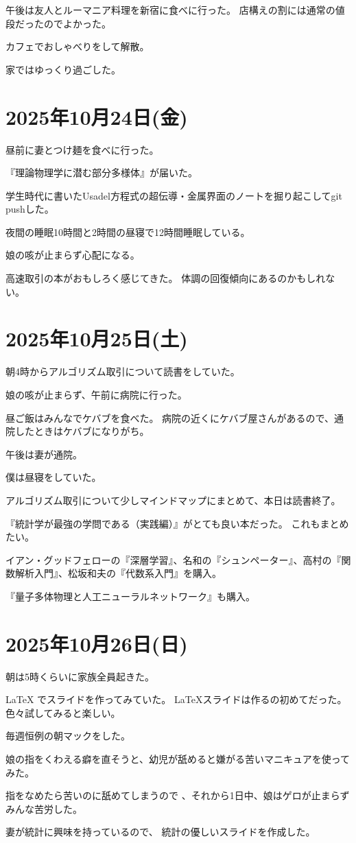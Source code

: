 \documentclass[uplatex]{jsarticle}
\begin{document}
午後は友人とルーマニア料理を新宿に食べに行った。
店構えの割には通常の値段だったのでよかった。

カフェでおしゃべりをして解散。

家ではゆっくり過ごした。

\section{2025年10月24日(金)} 

昼前に妻とつけ麺を食べに行った。

『理論物理学に潜む部分多様体』が届いた。

学生時代に書いたUsadel方程式の超伝導・金属界面のノートを掘り起こしてgit pushした。

夜間の睡眠10時間と2時間の昼寝で12時間睡眠している。

娘の咳が止まらず心配になる。

高速取引の本がおもしろく感じてきた。
体調の回復傾向にあるのかもしれない。

\section{2025年10月25日(土)} 

朝4時からアルゴリズム取引について読書をしていた。

娘の咳が止まらず、午前に病院に行った。

昼ご飯はみんなでケバブを食べた。
病院の近くにケバブ屋さんがあるので、通院したときはケバブになりがち。

午後は妻が通院。

僕は昼寝をしていた。

アルゴリズム取引について少しマインドマップにまとめて、本日は読書終了。

『統計学が最強の学問である（実践編）』がとても良い本だった。
これもまとめたい。

イアン・グッドフェローの『深層学習』、名和の『シュンペーター』、高村の『関数解析入門』、松坂和夫の『代数系入門』を購入。

『量子多体物理と人工ニューラルネットワーク』も購入。

\section{2025年10月26日(日)}

朝は5時くらいに家族全員起きた。

LaTeX でスライドを作ってみていた。
LaTeXスライドは作るの初めてだった。
色々試してみると楽しい。

毎週恒例の朝マックをした。

娘の指をくわえる癖を直そうと、幼児が舐めると嫌がる苦いマニキュアを使ってみた。

指をなめたら苦いのに舐めてしまうので 、それから1日中、娘はゲロが止まらずみんな苦労した。

妻が統計に興味を持っているので、 統計の優しいスライドを作成した。
\end{document}

